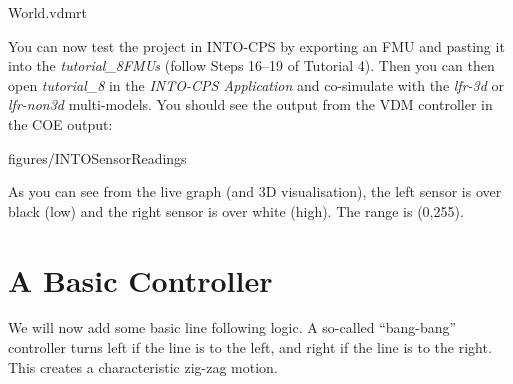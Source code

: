 \documentclass[11pt,a4paper]{../tutorial}
\begin{document}
\begin{instructions}
    \bigskip
    
    {World.vdmrt}

\item You can now test the project in INTO-CPS by exporting an FMU and pasting it into the \emph{tutorial\_8\pathsep{}FMUs} (follow Steps 16--19 of Tutorial 4). Then you can then open \emph{tutorial\_8} in the \emph{INTO-CPS Application} and co-simulate with the \emph{lfr-3d} or \emph{lfr-non3d} multi-models. You should see the output from the VDM controller in the COE output:

    \begin{annotation}[width=0.99\linewidth,trim=0 70 0 0,clip]{figures/INTOSensorReadings}
    \end{annotation}

    As you can see from the live graph (and 3D visualisation), the left sensor is over black (low) and the right sensor is over white (high). The range is (0,255).

\end{instructions}

\newpage
\section{A Basic Controller}

We will now add some basic line following logic. A so-called ``bang-bang'' controller turns left if the line is to the left, and right if the line is to the right. This creates a characteristic zig-zag motion.
\end{document}
